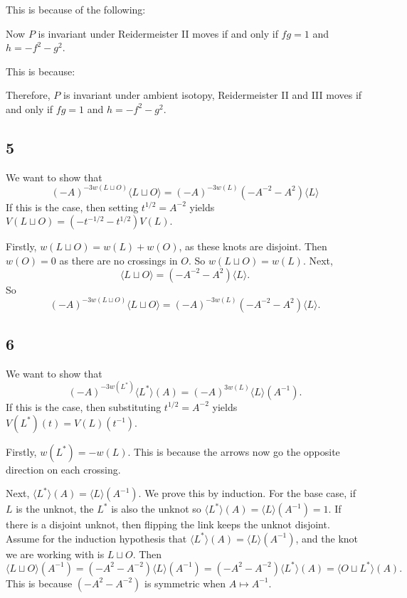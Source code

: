 \documentclass{article}
\theoremstyle{definition}
\numberwithin{theorem}{section}
\numberwithin{equation}{section}
\begin{document}
This is because of the following:


Now $P$ is invariant under Reidermeister II moves if and only if $fg = 1$ and $h = -f^2 - g^2$. 

This is because:


Therefore, $P$ is invariant under ambient isotopy, Reidermeister II and III moves if and only if $fg = 1$ and $h = -f^2 - g^2$. 

\subsection{5}

We want to show that \[(-A)^{-3w(L \sqcup O)} \langle L \sqcup O \rangle = (-A)^{-3w(L)}(-A^{-2} - A^2)\langle L \rangle\] If this is the case, then setting $t^{1/2} = A^{-2}$ yields $V(L \sqcup O) = (-t^{-1/2} - t^{1/2}) V(L)$.

Firstly, $w(L \sqcup O) = w(L) + w(O)$, as these knots are disjoint. Then $w(O) = 0$ as there are no crossings in $O$. So $w(L \sqcup O) = w(L)$. Next, \[\langle L \sqcup O \rangle = (-A^{-2} - A^2)\langle L \rangle.\] So \[(-A)^{-3w(L \sqcup O)} \langle L \sqcup O \rangle = (-A)^{-3w(L)}(-A^{-2} - A^2)\langle L \rangle.\]

\subsection{6}

We want to show that \[(-A)^{-3w(L^*)}\langle L^* \rangle(A) = (-A)^{3w(L)}\langle L \rangle(A^{-1}).\] If this is the case, then substituting $t^{1/2} = A^{-2}$ yields $V(L^*)(t) = V(L)(t^{-1})$. 

Firstly, $w(L^*) = -w(L)$. This is because the arrows now go the opposite direction on each crossing. 

Next, $\langle L^* \rangle(A) = \langle L \rangle(A^{-1})$. We prove this by induction.
For the base case, if $L$ is the unknot, the $L^*$ is also the unknot so $\langle L^* \rangle(A) = \langle L \rangle(A^{-1}) = 1$. If there is a disjoint unknot, then flipping the link keeps the unknot disjoint. Assume for the induction hypothesis that $\langle L^* \rangle(A) = \langle L \rangle(A^{-1})$, and the knot we are working with is $L \sqcup O$. Then
\[\langle L \sqcup O \rangle(A^{-1}) = (-A^2 - A^{-2}) \langle L \rangle(A^{-1}) = (-A^2 - A^{-2}) \langle L^* \rangle(A) = \langle O \sqcup L^* \rangle(A).\]
This is because $(-A^2 - A^{-2})$ is symmetric when $A \mapsto A^{-1}$.
\end{document}
